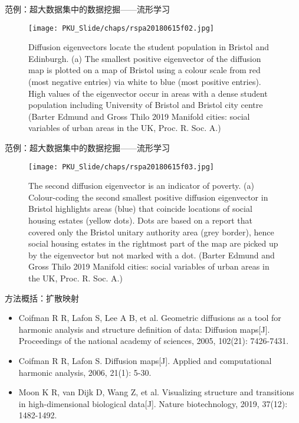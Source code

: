 \begin{frame}{范例：超大数据集中的数据挖掘——流形学习}
    \begin{figure}
        \centering
        \texttt{[image: PKU\_Slide/chaps/rspa20180615f02.jpg]}
        \caption{Diffusion eigenvectors locate the student population in Bristol and Edinburgh. (a) The smallest positive eigenvector of the diffusion map is plotted on a map of Bristol using a colour scale from red (most negative entries) via white to blue (most positive entries). High values of the eigenvector occur in areas with a dense student population including University of Bristol and Bristol city centre (Barter Edmund and Gross Thilo 2019 Manifold cities: social variables of urban areas in the UK, Proc. R. Soc. A.)}
    \end{figure}
\end{frame}

\begin{frame}{范例：超大数据集中的数据挖掘——流形学习}
    \begin{figure}
        \centering
        \texttt{[image: PKU\_Slide/chaps/rspa20180615f03.jpg]}
        \caption{The second diffusion eigenvector is an indicator of poverty. (a) Colour-coding the second smallest positive diffusion eigenvector in Bristol highlights areas (blue) that coincide locations of social housing estates (yellow dots). Dots are based on a report that covered only the Bristol unitary authority area (grey border), hence social housing estates in the rightmost part of the map are picked up by the eigenvector but not marked with a dot.  (Barter Edmund and Gross Thilo 2019 Manifold cities: social variables of urban areas in the UK, Proc. R. Soc. A.)}
    \end{figure}
\end{frame}

\begin{frame}{方法概括：扩散映射}
\begin{itemize}
    \item Coifman R R, Lafon S, Lee A B, et al. Geometric diffusions as a tool for harmonic analysis and structure definition of data: Diffusion maps[J]. Proceedings of the national academy of sciences, 2005, 102(21): 7426-7431.
    \item Coifman R R, Lafon S. Diffusion maps[J]. Applied and computational harmonic analysis, 2006, 21(1): 5-30.
    \item Moon K R, van Dijk D, Wang Z, et al. Visualizing structure and transitions in high-dimensional biological data[J]. Nature biotechnology, 2019, 37(12): 1482-1492.
\end{itemize}
\end{frame}

